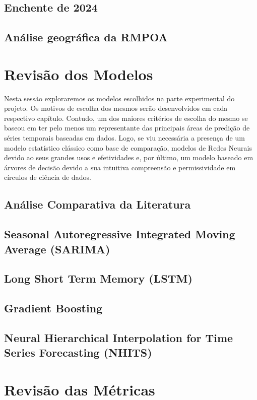 \documentclass[
	12pt,				%
	openright,			%
	twoside,			%
	a4paper,			%
	english,			%
	french,				%
	spanish,			%
	brazil				%
	]{abntex2}
\begin{document}
    \section{Enchente de 2024}
    
    \section{Análise geográfica da RMPOA}
    

\chapter{Revisão dos Modelos}
  Nesta sessão exploraremos os modelos escolhidos na parte experimental do projeto. Os motivos de escolha dos mesmos serão
  desenvolvidos em cada respectivo capítulo. Contudo, um dos maiores critérios de escolha do mesmo se baseou em ter pelo
  menos um representante das principais áreas de predição de séries temporais baseadas em dados. Logo, se viu necessária a
  presença de um modelo estatístico clássico como base de comparação, modelos de Redes Neurais devido ao seus grandes usos
  e efetividades e, por último, um modelo baseado em árvores de decisão devido a sua intuitiva compreensão e
  permissividade em círculos de ciência de dados. 
    \section{Análise Comparativa da Literatura}
    
    \section{Seasonal Autoregressive Integrated Moving Average (SARIMA)}
    
    \section{Long Short Term Memory (LSTM)}
    
    \section{Gradient Boosting}
    
    \section{Neural Hierarchical Interpolation for Time Series Forecasting (NHITS)}
    
\chapter{Revisão das Métricas}
    \lipsum[1] 
\end{document}

